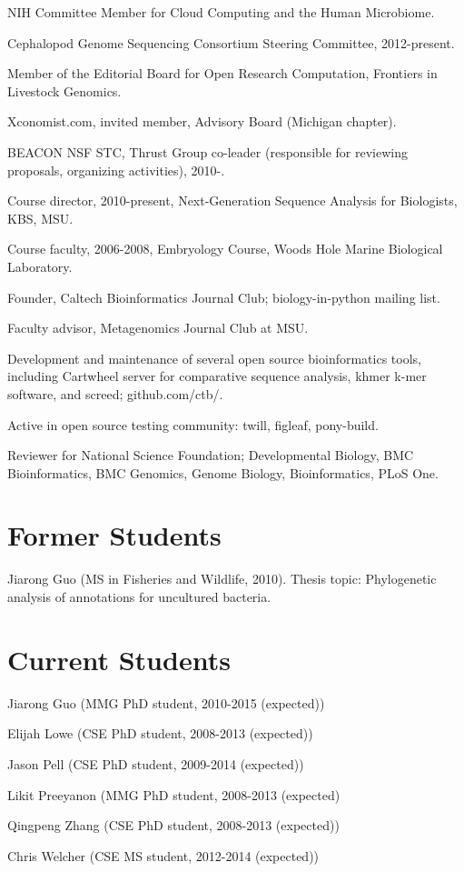 \documentclass[margin,line]{resume}
\begin{document}
\begin{resume}
\begin{list1}
\item[] NIH Committee Member for Cloud Computing and the Human Microbiome.
\item[] Cephalopod Genome Sequencing Consortium Steering Committee, 2012-present.
\item[] Member of the Editorial Board for Open Research Computation,
Frontiers in Livestock Genomics.
\item[] Xconomist.com, invited member, Advisory Board (Michigan chapter).
\item[] BEACON NSF STC, Thrust Group co-leader (responsible for reviewing
proposals, organizing activities), 2010-.
\item[] Course director, 2010-present, Next-Generation Sequence Analysis for Biologists, KBS, MSU.
\item[] Course faculty, 2006-2008, Embryology Course, Woods Hole Marine Biological Laboratory.
\item[] Founder, Caltech Bioinformatics Journal Club; biology-in-python
mailing list.
\item[] Faculty advisor, Metagenomics Journal Club at MSU.
\item[] Development and maintenance of several open source bioinformatics tools, including
Cartwheel server for comparative sequence analysis, khmer k-mer software,
and screed; github.com/ctb/.
\item[] Active in open source testing community: twill, figleaf, pony-build.
\item[] Reviewer for National Science Foundation; Developmental Biology, BMC Bioinformatics, BMC Genomics, Genome Biology, Bioinformatics, PLoS One.
\end{list1}

\newpage

\section{\mysidestyle Former Students}

Jiarong Guo (MS in Fisheries and Wildlife, 2010).  Thesis topic:
Phylogenetic analysis of annotations for uncultured bacteria.

\section{\mysidestyle Current Students}

\begin{list1}
\item[] Jiarong Guo (MMG PhD student, 2010-2015 (expected))
\item[] Elijah Lowe (CSE PhD student, 2008-2013 (expected))
\item[] Jason Pell (CSE PhD student, 2009-2014 (expected))
\item[] Likit Preeyanon (MMG PhD student, 2008-2013 (expected)
\item[] Qingpeng Zhang (CSE PhD student, 2008-2013 (expected))
\item[] Chris Welcher (CSE MS student, 2012-2014 (expected))
\end{list1}

\end{resume}
\end{document}
